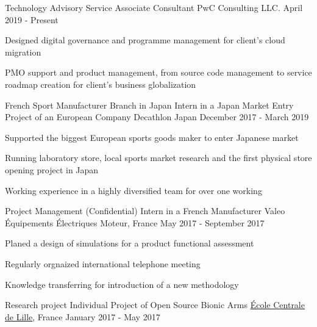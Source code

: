 \documentclass[12pt, a4paper]{cvncl}
\newcommand{\link}[2]{\href{#1}{#2}}
\begin{document}
\makecvheader

\begin{cventries}
  \cventry
    {Technology Advisory Service}
	{Associate Consultant}
    {PwC Consulting LLC.}
    {April 2019 - Present}
    {\begin{cvitems}
        \item{Designed digital governance and programme management for client's cloud migration}
        \item{PMO support and product management, from source code management to service roadmap creation for client's business globalization}
    \end{cvitems}}
  \cventry
    {French Sport Manufacturer Branch in Japan}
    {Intern in a Japan Market Entry Project of an European Company}
    {Decathlon Japan}
    {December 2017 - March 2019}
    {\begin{cvitems}
	\item{Supported the biggest European sports goods maker to enter Japanese market}
	\item{Running laboratory store, local sports market research and the first physical store opening project in Japan}
	\item{Working experience in a highly diversified team for over one working}
    \end{cvitems}}
  \cventry
    {Project Management (Confidential)}
	{Intern in a French Manufacturer}
    {Valeo \'Equipements \'Electriques Moteur, France}
    {May 2017 - September 2017}
    {\begin{cvitems}
        \item{Planed a design of simulations for a product functional assessment}
        \item{Regularly orgnaized international telephone meeting}
        \item{Knowledge transferring for introduction of a new methodology}
    \end{cvitems}}
  \cventry
    {Research project}
    {Individual Project of Open Source Bionic Arms}
    {\link{http://www.ec-lille.fr/en/index.html}{\'Ecole Centrale de Lille}, France}
    {January 2017 - May 2017}
    {\begin{cvitems}

\end{cvitems}}
\end{cventries}
\end{document}
